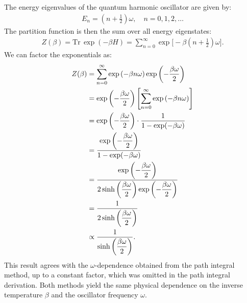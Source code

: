 \begin{enumerate}
    The energy eigenvalues of the quantum harmonic oscillator are given by:
    \begin{align}
        E_n = \left( n + \frac{1}{2} \right) \omega, \quad n = 0, 1, 2, \dots
    \end{align}
    The partition function is then the sum over all energy eigenstates:
    \begin{align}
        Z(\beta) = \text{Tr} \, \exp(-\beta H) = \sum_{n=0}^{\infty} \exp\bigg[-\beta \left( n + \frac{1}{2} \right) \omega \bigg]. 
    \end{align}
    We can factor the exponentials as:
    \begin{align}
        Z(\beta) &= \sum_{n=0}^{\infty} \exp\left( -\beta n \omega \right) \exp\left( -\frac{\beta \omega}{2} \right) \notag \\
        &= \exp\left( -\frac{\beta \omega}{2} \right)\left[\sum_{n=0}^{\infty} \exp\left( -\beta n \omega \right)\right]\notag\\
        &= \exp\left(\displaystyle-\frac{\beta \omega}{2} \right)\cdot\frac{1}{1 - \exp(-\beta \omega)} \notag \\
        &= \frac{\displaystyle\exp\left( -\frac{\beta \omega}{2} \right)}{1 - \exp(-\beta \omega)}\notag\\
        &= \frac{\displaystyle\exp\left( -\frac{\beta \omega}{2} \right)}{\displaystyle2\sinh\left( \frac{\beta \omega}{2} \right) \exp\left( -\frac{\beta \omega}{2} \right)} \notag \\
        &= \frac{1}{\displaystyle2\sinh\left( \frac{\displaystyle\beta \omega}{2} \right)}\notag\\
        &\propto \frac{1}{\displaystyle\sinh\left(\frac{\beta\omega}{2}\right)}.
    \end{align}
    This result agrees with the $\omega$-dependence obtained from the path integral method, up to a constant factor, which was omitted in the path integral derivation. Both methods yield the same physical dependence on the inverse temperature $\beta$ and the oscillator frequency $\omega$.
\end{enumerate}
\bigskip\bigskip\hline\hline\bigskip